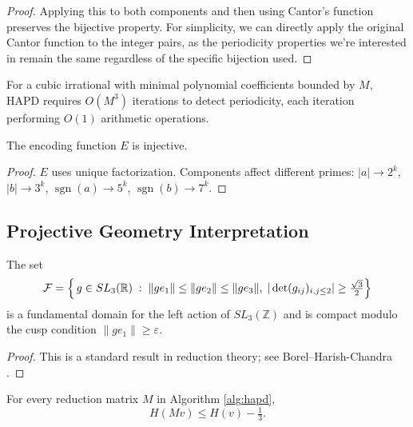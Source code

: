 \begin{theorem}
\begin{proof}
Applying this to both components and then using Cantor's function preserves the bijective property. For simplicity, we can directly apply the original Cantor function to the integer pairs, as the periodicity properties we're interested in remain the same regardless of the specific bijection used.
\end{proof}

\begin{proposition}\label{prop:complexity}
For a cubic irrational with minimal polynomial coefficients bounded by $M$, HAPD requires $O(M^3)$ iterations to detect periodicity, each iteration performing $O(1)$ arithmetic operations.
\end{proposition}

\begin{lemma}\label{lem:encoding_injective}
The encoding function $E$ is injective.
\end{lemma}

\begin{proof}
$E$ uses unique factorization. Components affect different primes: $|a| \to 2^k$, $|b| \to 3^k$, $\operatorname{sgn}(a) \to 5^k$, $\operatorname{sgn}(b) \to 7^k$.
\end{proof}

\subsection{Projective Geometry Interpretation}

\begin{lemma}\label{lem:mahler_compactness}
The set
\[
\mathcal{F}=\Bigl\{\,g\in SL_{3}(\mathbb{R})\;:\;
\|g e_{1}\|\le\|g e_{2}\|\le\|g e_{3}\|,\;
|\det(g_{ij})_{i,j\le2}|\ge\tfrac{\sqrt3}{2}\Bigr\}
\]
is a fundamental domain for the left action of $SL_{3}(\mathbb{Z})$ and is compact modulo the cusp condition $\|g e_{1}\|\ge\varepsilon$.
\end{lemma}

\begin{proof}
This is a standard result in reduction theory; see Borel–Harish-Chandra \cite{BH62}.
\end{proof}

\begin{lemma}\label{lem:height_drop}
For every reduction matrix $M$ in Algorithm \ref{alg:hapd},
\[
H(Mv) \leq H(v)-\tfrac{1}{3}.
\]
\end{lemma}


\end{theorem}
